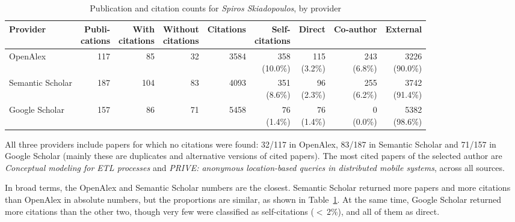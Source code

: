\begin{table}[tb]
    \centering
    \footnotesize
    \setlength{\tabcolsep}{3pt}
    \begin{tabular}{|l|r|r|r|r|r|r|r|r|}
        \hline
        Provider & \shortstack{Publi-\\cations} & \shortstack{With\\citations} & \shortstack{Without\\citations} & Citations & \shortstack{Self-\\citations} & Direct & Co-author & External \\
        \hline\hline
        \textsf{OpenAlex} & 117 & 85 & 32 & 3584 & \shortstack[r]{358\\(10.0\%)} & \shortstack[r]{115\\(3.2\%)} & \shortstack[r]{243\\(6.8\%)} & \shortstack[r]{3226\\(90.0\%)} \\
        \textsf{Semantic Scholar} & 187 & 104 & 83 & 4093 & \shortstack[r]{351\\(8.6\%)} & \shortstack[r]{96\\(2.3\%)} & \shortstack[r]{255\\(6.2\%)} & \shortstack[r]{3742\\(91.4\%)} \\
        \textsf{Google Scholar} & 157 & 86 & 71 & 5458 & \shortstack[r]{76\\(1.4\%)} & \shortstack[r]{76\\(1.4\%)} & \shortstack[r]{0\\(0.0\%)} & \shortstack[r]{5382\\(98.6\%)} \\
        \hline
    \end{tabular}
    \caption{Publication and citation counts for \emph{Spiros Skiadopoulos}, by provider}
    \label{tab:provider-comparison}
\end{table}

All three providers include papers for which no citations were found: 32/117 in \textsf{OpenAlex}, 83/187 in \textsf{Semantic Scholar} and 71/157 in \textsf{Google Scholar} (mainly these are duplicates and alternative versions of cited papers).
The most cited papers of the selected author are \emph{Conceptual modeling for ETL processes} and \emph{PRIVE: anonymous location-based queries in distributed mobile systems}, across all sources.

In broad terms, the \textsf{OpenAlex} and \textsf{Semantic Scholar} numbers are the closest.
\textsf{Semantic Scholar} returned more papers and more citations than \textsf{OpenAlex} in absolute numbers, but the proportions are similar, as shown in Table~\ref{tab:provider-comparison}.
At the same time, \textsf{Google Scholar} returned more citations than the other two, though very few were classified as self-citations ($<$\,2\%), and all of them as \textsf{direct}.

